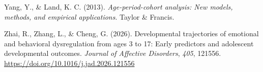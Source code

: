\documentclass[
  american,
  letterpaper,
  12pt]{article}
\newlength{\cslhangindent}
\newenvironment{CSLReferences}[2] %
 {\begin{list}{}{%
  \setlength{\itemindent}{0pt}
  \setlength{\leftmargin}{0pt}
  \setlength{\parsep}{0pt}
  \ifodd #1
   \setlength{\leftmargin}{\cslhangindent}
   \setlength{\itemindent}{-1\cslhangindent}
  \fi
  \setlength{\itemsep}{#2\baselineskip}}}
 {\end{list}}
\begin{document}
\begin{CSLReferences}{1}{0}
Yang, Y., \& Land, K. C. (2013). \emph{Age-period-cohort analysis: {New}
models, methods, and empirical applications}. Taylor \& Francis.

Zhai, R., Zhang, L., \& Cheng, G. (2026). Developmental trajectories of
emotional and behavioral dysregulation from ages 3 to 17: {Early}
predictors and adolescent developmental outcomes. \emph{Journal of
Affective Disorders}, \emph{405}, 121556.
\url{https://doi.org/10.1016/j.jad.2026.121556}

\end{CSLReferences}
\end{document}
